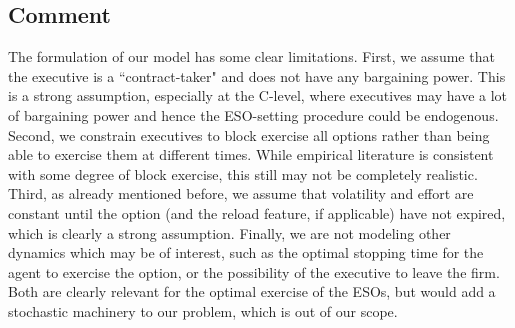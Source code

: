 \subsection*{Comment}

The formulation of our model has some clear limitations. First, we assume that the executive is a ``contract-taker" and does not have any bargaining power. This is a strong assumption, especially at the C-level, where executives may have a lot of bargaining power and hence the ESO-setting procedure could be endogenous. Second, we constrain executives to block exercise all options rather than being able to exercise them at different times. While empirical literature is consistent with some degree of block exercise, %
this still may not be completely realistic. Third, as already mentioned before, we assume that volatility and effort are constant until the option (and the reload feature, if applicable) have not expired, which is clearly a strong assumption. Finally, we are not modeling other dynamics which may be of interest, such as the optimal stopping time for the agent to exercise the option, or the possibility of the executive to leave the firm. Both are clearly relevant for the optimal exercise of the ESOs, but would add a stochastic machinery to our problem, which is out of our scope. 
